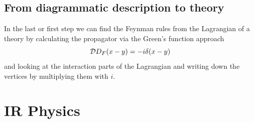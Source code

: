 \subsection{From diagrammatic description to theory}
In the last or first step we can find the Feynman rules from the Lagrangian of a theory by calculating the propagator via the Green's function approach
\begin{equation}
 \mathcal{D} D_F(x-y) = -i \delta(x-y)
\end{equation}
and looking at the interaction parts of the Lagrangian and writing down the vertices by multiplying them with $i$.





































\section{IR Physics}
